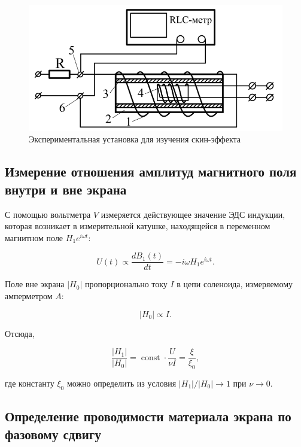 \documentclass[a4paper, 12pt]{article}
\begin{document}
    \begin{figure}[H]
        \centering
        \includegraphics[width = 14 cm]{images/installation_2.png}
        \caption{Экспериментальная установка для изучения скин-эффекта}
        \label{fig:installation_2}
    \end{figure}

    \subsection{Измерение отношения амплитуд магнитного поля внутри и вне экрана}

    С помощью вольтметра $V$ измеряется действующее значение ЭДС индукции, которая возникает в измерительной катушке, находящейся в переменном магнитном поле $H_1 e^{i\omega t}$:

    \begin{equation*}
        U(t) \propto \frac{dB_1(t)}{dt} = -i \omega H_1 e^{i \omega t}.
    \end{equation*}

    Поле вне экрана $\lvert H_0 \rvert$ пропорционально току $I$ в цепи соленоида, измеряемому амперметром $A$:

    \begin{equation*}
        \lvert H_0 \rvert \propto I.
    \end{equation*}

    Отсюда, 

    \begin{equation}
        \frac{\lvert H_1 \rvert}{\lvert H_0 \rvert} = \operatorname{const} \cdot \frac{U}{\nu I} = \frac{\xi}{\xi_0},
    \end{equation}

    где константу $\xi_0$ можно определить из условия $\lvert H_1 \rvert/\lvert H_0 \rvert \rightarrow 1$ при $\nu \rightarrow 0$.

    \subsection{Определение проводимости материала экрана по фазовому сдвигу}
\end{document}
